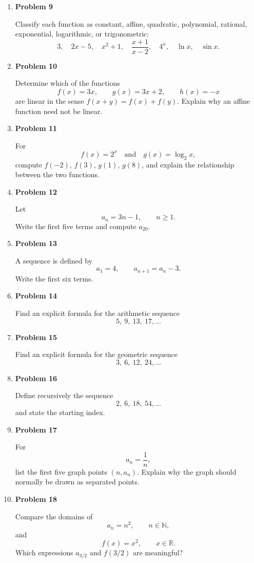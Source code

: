 \begin{enumerate}
\item \textbf{Problem 9}\par
Classify each function as constant, affine, quadratic, polynomial, rational, exponential, logarithmic, or trigonometric:
\[
3,\quad 2x-5,\quad x^2+1,\quad \frac{x+1}{x-2},\quad 4^x,\quad \ln x,\quad \sin x.
\]

\item \textbf{Problem 10}\par
Determine which of the functions
\[
f(x)=3x,\qquad g(x)=3x+2,\qquad h(x)=-x
\]
are linear in the sense \(f(x+y)=f(x)+f(y)\). Explain why an affine function need not be linear.

\item \textbf{Problem 11}\par
For
\[
f(x)=2^x
\quad\text{and}\quad
g(x)=\log_2 x,
\]
compute \(f(-2)\), \(f(3)\), \(g(1)\), \(g(8)\), and explain the relationship between the two functions.

\item \textbf{Problem 12}\par
Let
\[
a_n=3n-1,\qquad n\ge1.
\]
Write the first five terms and compute \(a_{20}\).

\item \textbf{Problem 13}\par
A sequence is defined by
\[
a_1=4,\qquad a_{n+1}=a_n-3.
\]
Write the first six terms.

\item \textbf{Problem 14}\par
Find an explicit formula for the arithmetic sequence
\[
5,\ 9,\ 13,\ 17,\ldots
\]

\item \textbf{Problem 15}\par
Find an explicit formula for the geometric sequence
\[
3,\ 6,\ 12,\ 24,\ldots
\]

\item \textbf{Problem 16}\par
Define recursively the sequence
\[
2,\ 6,\ 18,\ 54,\ldots
\]
and state the starting index.

\item \textbf{Problem 17}\par
For
\[
a_n=\frac{1}{n},
\]
list the first five graph points \((n,a_n)\). Explain why the graph should normally be drawn as separated points.

\item \textbf{Problem 18}\par
Compare the domains of
\[
a_n=n^2,\qquad n\in\mathbb{N},
\]
and
\[
f(x)=x^2,\qquad x\in\mathbb{R}.
\]
Which expressions \(a_{3/2}\) and \(f(3/2)\) are meaningful?


\end{enumerate}
